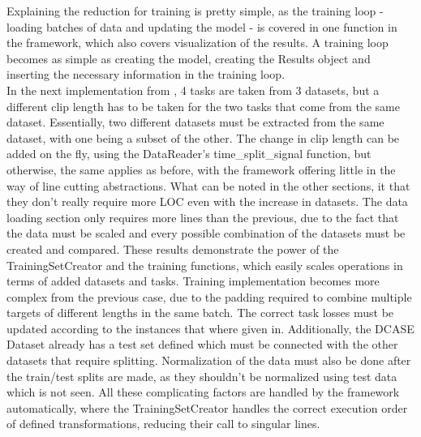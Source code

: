 Explaining the reduction for training is pretty simple, as the training loop - loading batches of data and updating the model - is covered in one function in the framework, which also covers visualization of the results. A training loop becomes as simple as creating the model, creating the Results object and inserting the necessary information in the training loop. \\

\textbf{\cite{georgiev2017low}} In the next implementation from \citep{georgiev2017low}, 4 tasks are taken from 3 datasets, but a different clip length has to be taken for the two tasks that come from the same dataset. Essentially, two different datasets must be extracted from the same dataset, with one being a subset of the other. The change in clip length can be added on the fly, using the DataReader's time\_split\_signal function, but otherwise, the same applies as before, with the framework offering little in the way of line cutting abstractions. What can be noted in the other sections, it that they don't really require more LOC even with the increase in datasets. The data loading section only requires more lines than the previous, due to the fact that the data must be scaled and every possible combination of the datasets must be created and compared. These results demonstrate the power of the TrainingSetCreator and the training functions, which easily scales operations in terms of added datasets and tasks. Training implementation becomes more complex from the previous case, due to the padding required to combine multiple targets of different lengths in the same batch. The correct task losses must be updated according to the instances that where given in. Additionally, the DCASE Dataset already has a test set defined which must be connected with the other datasets that require splitting. Normalization of the data must also be done after the train/test splits are made, as they shouldn't be normalized using test data which is not seen. All these complicating factors are handled by the framework automatically, where the TrainingSetCreator handles the correct execution order of defined transformations, reducing their call to singular lines. \\

